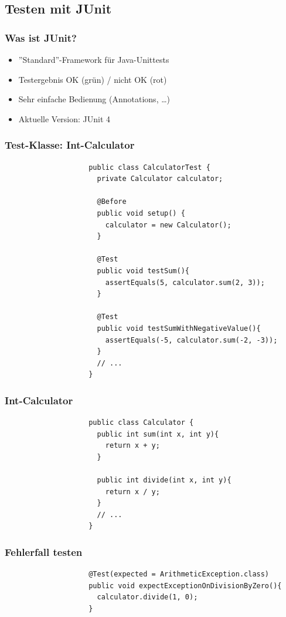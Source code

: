 \documentclass{beamer}
\begin{document}
		\subsection{Testen mit JUnit}

			\begin{frame}
				\frametitle{Was ist JUnit?}

				\begin{itemize}
					\item{''Standard''-Framework für Java-Unittests}
					\item{Testergebnis OK (grün) / nicht OK (rot)}
					\item{Sehr einfache Bedienung (Annotations, \ldots)}
					\item{Aktuelle Version: JUnit 4}
				\end{itemize}
			\end{frame}

			\begin{frame}[fragile]
				\frametitle{Test-Klasse: Int-Calculator}

				\begin{lstlisting}
					public class CalculatorTest {
					  private Calculator calculator;

					  @Before
					  public void setup() {
					    calculator = new Calculator();
					  }

					  @Test
					  public void testSum(){
					    assertEquals(5, calculator.sum(2, 3));
					  }

					  @Test
					  public void testSumWithNegativeValue(){
					    assertEquals(-5, calculator.sum(-2, -3));
					  }
					  // ...
					}
				\end{lstlisting}
			\end{frame}
		
			\begin{frame}[fragile]
				\frametitle{Int-Calculator}

				\begin{lstlisting}
					public class Calculator {
					  public int sum(int x, int y){
					    return x + y;
					  }

					  public int divide(int x, int y){
					    return x / y;
					  }
					  // ...
					}
				\end{lstlisting}
			\end{frame}

			\begin{frame}[fragile]
				\frametitle{Fehlerfall testen}

				\begin{lstlisting}
					@Test(expected = ArithmeticException.class)
					public void expectExceptionOnDivisionByZero(){
					  calculator.divide(1, 0);
					}
				\end{lstlisting}
			\end{frame}
\end{document}
